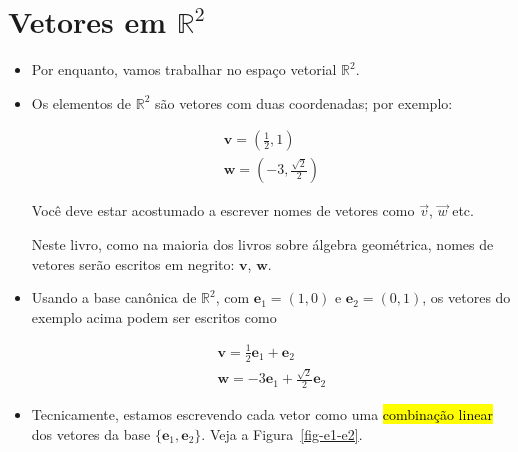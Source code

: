 \documentclass[
  letterpaper,
  DIV=11,
  numbers=noendperiod]{scrreprt}
\begin{document}
\hypertarget{sec-vetores-r2}{%
\section{\texorpdfstring{Vetores em
$\mathbb{R}^2$}{Vetores em }}\label{sec-vetores-r2}}

\begin{itemize}
\item
  Por enquanto, vamos trabalhar no espaço vetorial $\mathbb{R}^2$.
\item
  Os elementos de $\mathbb{R}^2$ são vetores com duas coordenadas; por
  exemplo:

  \[
  \begin{array}{l}
    \mathbf{v} = (\frac12, 1)\\
    \mathbf{w} = \left( -3, \frac{\sqrt{2}}{2} \right)
  \end{array}
  \]

  \begin{tcolorbox}[standard jigsaw,colframe=quarto-callout-warning-color-frame, toptitle=1mm, colback=white, bottomtitle=1mm, coltitle=black, titlerule=0mm, opacitybacktitle=0.6, arc=.35mm, toprule=.15mm, opacityback=0, bottomrule=.15mm, rightrule=.15mm, colbacktitle=quarto-callout-warning-color!10!white, leftrule=.75mm, title=\textcolor{quarto-callout-warning-color}{\faExclamationTriangle}\hspace{0.5em}{Notação: vetores em negrito}, left=2mm]
  Você deve estar acostumado a escrever nomes de vetores como $\vec v$,
  $\vec w$ etc.

  Neste livro, como na maioria dos livros sobre álgebra geométrica,
  nomes de vetores serão escritos em negrito: $\mathbf{v}$,
  $\mathbf{w}$.
  \end{tcolorbox}
\item
  Usando a base canônica de $\mathbb{R}^2$, com
  $\mathbf{e}_{1} = (1, 0)$ e $\mathbf{e}_{2} = (0, 1)$, os vetores do
  exemplo acima podem ser escritos como

  \[
  \begin{array}{l}
    \mathbf{v} = \frac12\mathbf{e}_{1} + \mathbf{e}_{2}\\
    \mathbf{w} = -3 \mathbf{e}_{1} + \frac{\sqrt{2}}{2}\mathbf{e}_{2}
  \end{array}
  \]
\item
  Tecnicamente, estamos escrevendo cada vetor como uma {\hl{combinação
  linear}} dos vetores da base $\{ \mathbf{e}_{1}, \mathbf{e}_{2} \}$.
  Veja a Figura~\ref{fig-e1-e2}.


\end{itemize}
\end{document}

